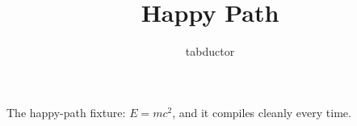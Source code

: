 \documentclass{article}
\begin{document}
\title{Happy Path}
\author{tabductor}
\maketitle
The happy-path fixture: $E = mc^2$, and it compiles cleanly every time.
\end{document}
